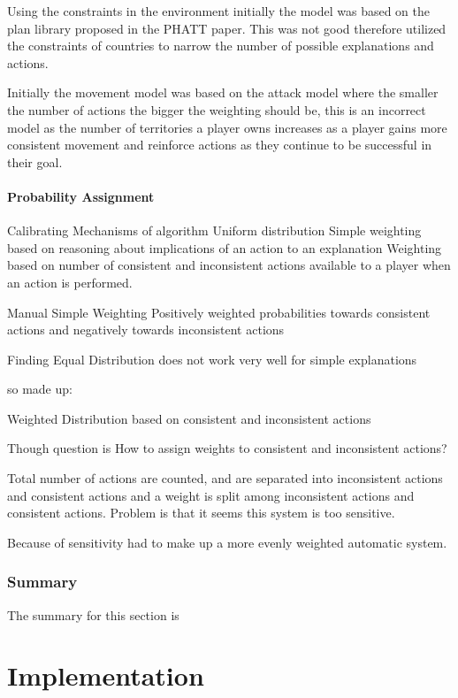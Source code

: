 \documentclass[parskip]{cs4rep}
\begin{document}
Using the constraints in the environment initially the model was based on the plan library proposed in the PHATT paper. This was not good therefore utilized the constraints of countries to narrow the number of possible explanations and actions.

Initially the movement model was based on the attack model where the smaller the number of actions the bigger the weighting should be, this is an incorrect model as the number of territories a player owns increases as a player gains more consistent movement and reinforce actions as they continue to be successful in their goal.

\subsubsection{Probability Assignment}

Calibrating Mechanisms of algorithm
Uniform distribution
Simple weighting based on reasoning about implications of an action to an explanation
Weighting based on number of consistent and inconsistent actions available to a player when an action is performed.

Manual Simple Weighting
Positively weighted probabilities towards consistent actions and negatively towards inconsistent actions

Finding
Equal Distribution does not work very well for simple explanations

so made up:

Weighted Distribution based on consistent and inconsistent actions

Though question is How to assign weights to consistent and inconsistent actions?

Total number of actions are counted, and are separated into inconsistent actions and consistent actions and a weight is split among inconsistent actions and consistent actions. Problem is that it seems this system is too sensitive.

Because of sensitivity had to make up a more evenly weighted automatic system.

\subsection{Summary}

The summary for this section is

\chapter{Implementation}
\end{document}
